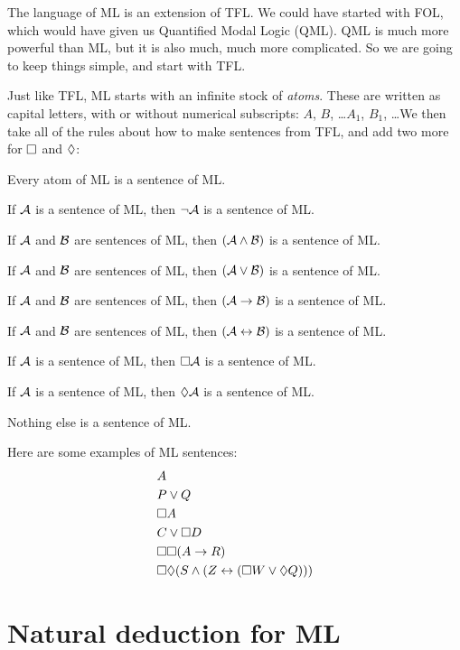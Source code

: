 The language of ML is an extension of TFL. We could have started with FOL, which would have given us Quantified Modal Logic (QML). QML is much more powerful than ML, but it is also much, much more complicated. So we are going to keep things simple, and start with TFL.

Just like TFL, ML starts with an infinite stock of \emph{atoms}. These are written as capital letters, with or without numerical subscripts: $A$, $B$, \dots  $A_1$, $B_1$, \dots  We then take all of the rules about how to make sentences from TFL, and add two more for $\Box$ and $\Diamond$:
\begin{compactlist}
	\item Every atom of ML is a sentence of ML.
	\item If $\mathcal{A}$ is a sentence of ML, then $\neg\mathcal{A}$ is a sentence of ML.
	\item If $\mathcal{A}$ and $\mathcal{B}$ are sentences of ML, then $(\mathcal{A}\wedge\mathcal{B})$ is a sentence of ML.
	\item If $\mathcal{A}$ and $\mathcal{B}$ are sentences of ML, then $(\mathcal{A}\vee\mathcal{B})$ is a sentence of ML.
	\item If $\mathcal{A}$ and $\mathcal{B}$ are sentences of ML, then $(\mathcal{A}\rightarrow\mathcal{B})$ is a sentence of ML.
	\item If $\mathcal{A}$ and $\mathcal{B}$ are sentences of ML, then $(\mathcal{A}\leftrightarrow\mathcal{B})$ is a sentence of ML.
	\item If $\mathcal{A}$ is a sentence of ML, then $\Box\mathcal{A}$ is a sentence of ML.
	\item If $\mathcal{A}$ is a sentence of ML, then $\Diamond\mathcal{A}$ is a sentence of ML.
	\item Nothing else is a sentence of ML.
\end{compactlist}
Here are some examples of ML sentences:
\begin{align*}
	& A\\
	& P\vee Q\\
	& \Box A\\
	& C\vee \Box D\\
	& \Box\Box (A\rightarrow R)\\
	& \Box\Diamond (S\wedge (Z\leftrightarrow (\Box W \vee \Diamond Q)))
\end{align*}

\chapter{Natural deduction for ML}
\label{Proof}

